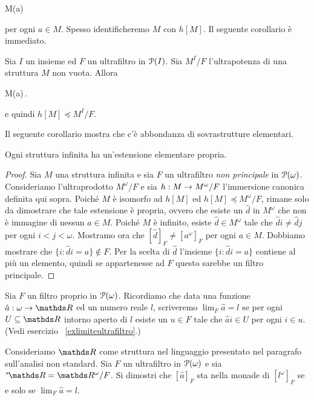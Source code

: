 %
{\IFF}%
{M\models \phi(a)}

per ogni $a\in M$. Spesso identificheremo $M$ con $h[M]$. Il seguente corollario \`e immediato.

\begin{corollary}\label{ultrapotenzeelementari}
Sia $I$ un insieme ed $F$ un ultrafiltro in $\P(I)$. Sia $M^I/F$ l'ultrapotenza di una struttura $M$ non vuota. Allora

%
{\IFF}%
{M\models \phi(a)\,.} 

e quindi $h[M]\preceq M^I/F$.\QED
\end{corollary}

Il seguente corollario mostra che c'\`e abbondanza di sovrastrutture elementari.

\begin{corollary}
Ogni struttura infinita ha un'estensione elementare propria.
\end{corollary}

\begin{proof}
Sia $M$ una struttura infinita e sia $F$ un ultrafiltro \textit{non principale\/} in $\P(\omega)$. Consideriamo l'ultraprodotto $M^\omega/F$ e sia $h:M\imp M^\omega/F$ l'immersione canonica definita qui sopra. Poich\'e $M$ \`e isomorfo ad $h[M]$ ed $h[M]\preceq M^\omega/F$, rimane solo da dimostrare che tale estensione \`e propria, ovvero che esiste un $\hat d$ in $M^\omega$ che non \`e immagine di nessun $a\in M$. Poich\'e $M$ \`e infinito, esiste $\hat d\in M^\omega$ tale che $\hat di\neq\hat dj$ per ogni $i<j<\omega$. Mostramo ora che $[\hat d]_F\neq[a^\omega]_F$ per ogni $a\in M$. Dobbiamo mostrare che $\{i:\hat di=a\}\notin F$. Per la scelta di $\hat d$ l'insieme $\{i:\hat di=a\}$ contiene al pi\`u un elemento, quindi se appartenesse ad $F$ questo sarebbe un filtro principale. 
\end{proof}





\begin{exercise}
Sia $F$ un filtro proprio in $\P(\omega)$. Ricordiamo che data una funzione $\hat a:\omega\imp\RR$ ed un numero reale $l$, scriveremo $\lim_{F} \hat a= l$ se per ogni $U\subseteq\RR$ intorno aperto di $l$ esiste un $u\in F$ tale che $\hat a i\in U$ per ogni $i\in u$. (Vedi esercizio~ \ref{exlimiteultrafiltro}.)

Consideriamo $\RR$ come struttura nel linguaggio presentato nel paragrafo sull'analisi non standard. Sia $F$ un ultrafiltro in $\P(\omega)$ e sia $\nsR=\RR^\omega/F$. Si dimostri che $[\hat a]_F$ sta nella monade di $[l^\omega]_F$ se e solo se $\lim_{F} \hat a= l$.\QED
\end{exercise}








